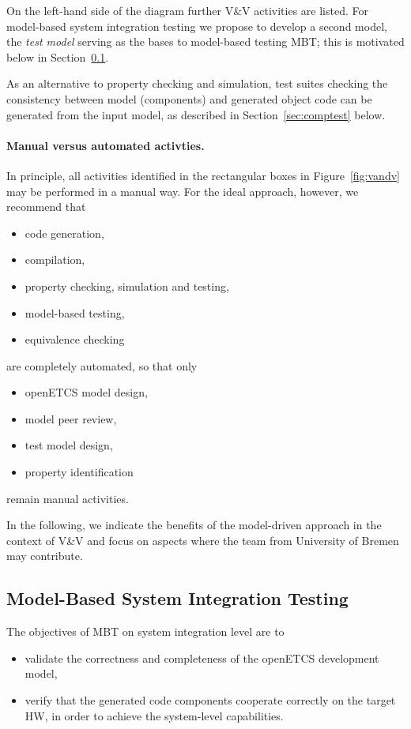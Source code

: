\documentclass[11pt, a4paper]{article}
\begin{document}
On the left-hand side of the diagram further V\&V activities are listed.
For model-based system integration testing we propose to develop a second model, the {\it test model}
serving as the bases to model-based testing MBT; this is motivated below in Section~\ref{sec:mbti}.

As an alternative to property checking and simulation, test suites checking the consistency between
model (components) and generated object code can be generated from the input model, 
as described in Section~\ref{sec:comptest} below.




\paragraph{Manual versus automated activties.}
In principle, all activities identified in the rectangular boxes in Figure~\ref{fig:vandv} may be performed in a manual way. For the ideal approach, however, we recommend that 
\begin{itemize}
\item code generation,
\item compilation,
\item property checking, simulation  and testing,
\item model-based testing,
\item equivalence checking
\end{itemize}
are completely automated, 
so that only 
\begin{itemize}
\item openETCS model design,
\item model peer review,
\item test model design,
\item property identification 
\end{itemize}
remain manual activities.

In the following, we indicate the benefits of the
model-driven approach in the context of V\&V and focus on 
aspects where the team from University of Bremen may contribute.


\subsection{Model-Based System Integration Testing}\label{sec:mbti}
The objectives of MBT on system integration level are to
\begin{itemize}
\item validate the correctness and completeness of the openETCS development model,
\item verify that the generated code components cooperate correctly on the target HW, in 
order to achieve the system-level 
capabilities.
\end{itemize}
\end{document}
